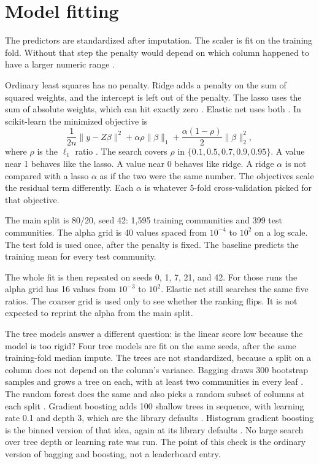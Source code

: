 \documentclass[conference]{IEEEtran}
\begin{document}
\section{Model fitting}
The predictors are standardized after imputation.
The scaler is fit on the training fold.
Without that step the penalty would depend on which column happened to have a larger numeric range \cite{hoerl1970,tibshirani1996}.

Ordinary least squares has no penalty.
Ridge adds a penalty on the sum of squared weights, and the intercept is left out of the penalty.
The lasso uses the sum of absolute weights, which can hit exactly zero \cite{tibshirani1996}.
Elastic net uses both \cite{zou2005}.
In scikit-learn the minimized objective is
\begin{equation}
\frac{1}{2n}\|y-Z\beta\|^{2}
+\alpha\rho\|\beta\|_{1}
+\frac{\alpha(1-\rho)}{2}\|\beta\|_{2}^{2},
\end{equation}
where $\rho$ is the $\ell_1$ ratio \cite{pedregosa2011}.
The search covers $\rho$ in $\{0.1, 0.5, 0.7, 0.9, 0.95\}$.
A value near 1 behaves like the lasso.
A value near 0 behaves like ridge.
A ridge $\alpha$ is not compared with a lasso $\alpha$ as if the two were the same number.
The objectives scale the residual term differently.
Each $\alpha$ is whatever 5-fold cross-validation picked for that objective.

The main split is 80/20, seed 42: 1{,}595 training communities and 399 test communities.
The alpha grid is 40 values spaced from $10^{-4}$ to $10^{2}$ on a log scale.
The test fold is used once, after the penalty is fixed.
The baseline predicts the training mean for every test community.

The whole fit is then repeated on seeds 0, 1, 7, 21, and 42.
For those runs the alpha grid has 16 values from $10^{-3}$ to $10^{2}$.
Elastic net still searches the same five ratios.
The coarser grid is used only to see whether the ranking flips.
It is not expected to reprint the alpha from the main split.

The tree models answer a different question: is the linear score low because the model is too rigid?
Four tree models are fit on the same seeds, after the same training-fold median impute.
The trees are not standardized, because a split on a column does not depend on the column's variance.
Bagging draws 300 bootstrap samples and grows a tree on each, with at least two communities in every leaf \cite{breiman1996}.
The random forest does the same and also picks a random subset of columns at each split \cite{breiman2001}.
Gradient boosting adds 100 shallow trees in sequence, with learning rate 0.1 and depth 3, which are the library defaults \cite{friedman2001}.
Histogram gradient boosting is the binned version of that idea, again at its library defaults \cite{pedregosa2011}.
No large search over tree depth or learning rate was run.
The point of this check is the ordinary version of bagging and boosting, not a leaderboard entry.
\end{document}
